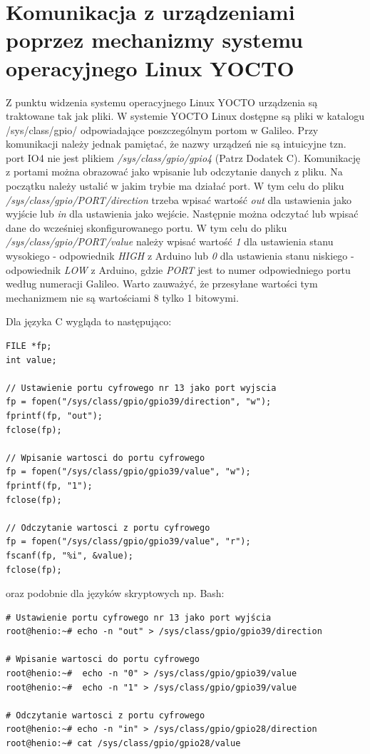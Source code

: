 \documentclass{xmgr}
\begin{document}
\section{Komunikacja z urządzeniami poprzez mechanizmy systemu operacyjnego Linux YOCTO}
Z punktu widzenia systemu operacyjnego Linux YOCTO urządzenia są traktowane tak jak pliki. W systemie YOCTO Linux dostępne są pliki w katalogu /sys/class/gpio/ odpowiadające poszczególnym portom w Galileo. Przy komunikacji należy jednak pamiętać, że nazwy urządzeń nie są intuicyjne tzn. port IO4 nie jest plikiem \emph{/sys/class/gpio/gpio4} (Patrz Dodatek C). Komunikację z portami można obrazować jako wpisanie lub odczytanie danych z pliku. Na początku należy ustalić w jakim trybie ma działać port. W tym celu do pliku \emph{/sys/class/gpio/PORT/direction} trzeba wpisać wartość \emph{out} dla ustawienia jako wyjście lub \emph{in} dla ustawienia jako wejście. Następnie można odczytać lub wpisać dane do wcześniej skonfigurowanego portu. W tym celu do pliku \emph{/sys/class/gpio/PORT/value} należy wpisać wartość \emph{1} dla ustawienia stanu wysokiego - odpowiednik \emph{HIGH} z Arduino lub \emph{0} dla ustawienia stanu niskiego - odpowiednik \emph{LOW} z Arduino, gdzie \emph{PORT} jest to numer odpowiedniego portu według numeracji Galileo. Warto zauważyć, że przesyłane wartości tym mechanizmem nie są wartościami 8 tylko 1 bitowymi.

Dla języka C wygląda to następująco:
\begin{lstlisting}[label=bot-dirs-alg,caption=Obsługa portu cyfrowego w środowisku Linux (język C)]
FILE *fp;
int value;

// Ustawienie portu cyfrowego nr 13 jako port wyjscia
fp = fopen("/sys/class/gpio/gpio39/direction", "w");
fprintf(fp, "out");
fclose(fp);

// Wpisanie wartosci do portu cyfrowego
fp = fopen("/sys/class/gpio/gpio39/value", "w");
fprintf(fp, "1");
fclose(fp);

// Odczytanie wartosci z portu cyfrowego
fp = fopen("/sys/class/gpio/gpio39/value", "r");
fscanf(fp, "%i", &value);
fclose(fp);
\end{lstlisting}

oraz podobnie dla języków skryptowych np. Bash:

\begin{lstlisting}[label=bot-dirs-alg,caption=Obsługa portu cyfrowego w środowisku Linux (bash)]
# Ustawienie portu cyfrowego nr 13 jako port wyjścia
root@henio:~# echo -n "out" > /sys/class/gpio/gpio39/direction

# Wpisanie wartosci do portu cyfrowego
root@henio:~#  echo -n "0" > /sys/class/gpio/gpio39/value
root@henio:~#  echo -n "1" > /sys/class/gpio/gpio39/value

# Odczytanie wartosci z portu cyfrowego
root@henio:~# echo -n "in" > /sys/class/gpio/gpio28/direction
root@henio:~# cat /sys/class/gpio/gpio28/value
\end{lstlisting}
\end{document}
